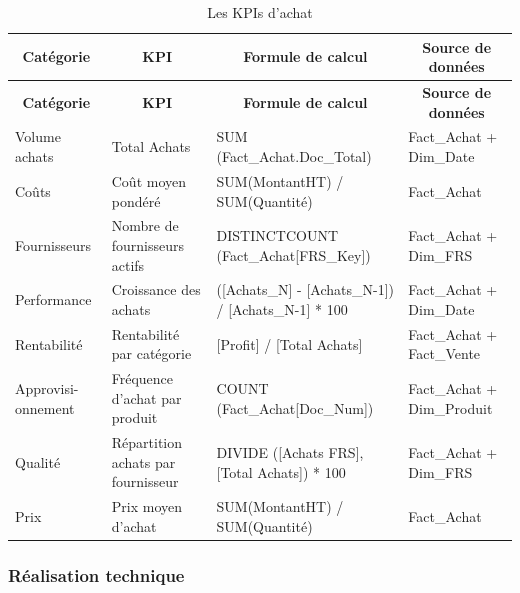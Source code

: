 {\small
\renewcommand{\arraystretch}{1.2}
\setlength{\tabcolsep}{4pt}


\begin{longtable}{|p{2.8cm}|p{2.8cm}|p{4.5cm}|p{4.5cm}|}

\caption{Les KPIs d'achat} \\

\hline
\multicolumn{1}{|c|}{\textbf{Catégorie}} & 
\multicolumn{1}{c|}{\textbf{KPI}} & 
\multicolumn{1}{c|}{\textbf{Formule de calcul}} & 
\multicolumn{1}{c|}{\textbf{Source de données}} \\
\hline
\endfirsthead

\hline
\multicolumn{1}{|c|}{\textbf{Catégorie}} & 
\multicolumn{1}{c|}{\textbf{KPI}} & 
\multicolumn{1}{c|}{\textbf{Formule de calcul}} & 
\multicolumn{1}{c|}{\textbf{Source de données}} \\
\hline
\endhead

\hline
\endfoot

Volume achats & Total Achats & SUM (Fact\_Achat.Doc\_Total) & Fact\_Achat + Dim\_Date \\
\hline

Coûts & Coût moyen pondéré & SUM(MontantHT) / SUM(Quantité) & Fact\_Achat \\
\hline

Fournisseurs & Nombre de fournisseurs actifs & DISTINCTCOUNT (Fact\_Achat[FRS\_Key]) & Fact\_Achat + Dim\_FRS \\
\hline

Performance & Croissance des achats & ([Achats\_N] - [Achats\_N-1]) / [Achats\_N-1] * 100 & Fact\_Achat + Dim\_Date \\
\hline

Rentabilité & Rentabilité par catégorie & [Profit] / [Total Achats] & Fact\_Achat + Fact\_Vente \\
\hline

Approvisi-onnement & Fréquence d'achat par produit & COUNT (Fact\_Achat[Doc\_Num]) & Fact\_Achat + Dim\_Produit \\
\hline

Qualité & Répartition achats par fournisseur & DIVIDE ([Achats FRS], [Total Achats]) * 100 & Fact\_Achat + Dim\_FRS \\
\hline

Prix & Prix moyen d'achat & SUM(MontantHT) / SUM(Quantité) & Fact\_Achat \\
\hline

\end{longtable}
}
\subsubsection{Réalisation technique}

